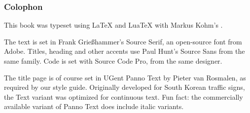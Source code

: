 \documentclass[main]{subfiles}
\begin{document}
\vspace*{\fill}

\begin{small}
    \subsubsection*{Colophon}

    This book was typeset using {\LaTeX} and {Lua\TeX} with Markus Kohm's {\KOMAScript}.

    The text is set in Frank Grießhammer's Source Serif, an open-source font from Adobe.
    Titles, heading and other accents use Paul Hunt's {\sffamily Source Sans} from the same family.
    Code is set with {\ttfamily Source Code Pro}, from the same designer.

    The title page is of course set in {\panno\selectfont UGent Panno Text} by Pieter van Rosmalen, as required by our style guide.
    Originally developed for South Korean traffic signs, the Text variant was optimized for continuous text.
    Fun fact: the commercially available variant of Panno Text does include italic variants.
\end{small}
\end{document}
